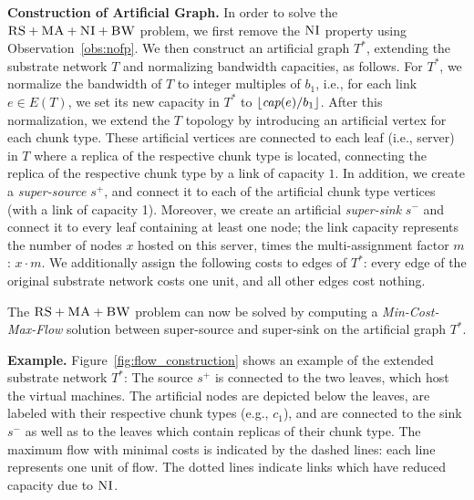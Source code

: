 \documentclass[9pt]{sigcomm-alternate}
\newcommand{\maciek}[1]{\textcolor{brown}{maciek: #1}}
\newcommand{\MaFactor}{m}
\newcommand{\Source}{\ensuremath{s^{+}}}
\newcommand{\Sink}{\ensuremath{s^{-}}}
\newcommand{\achunk}{\ensuremath{c}}
\newcommand{\capacity}{\emph{cap}}
\newcommand{\CC}{\textsc{NI}}
\newcommand{\FP}{\textsc{FP}}
\newcommand{\RS}{\textsc{RS}}
\newcommand{\BW}{\textsc{BW}}
\newcommand{\MA}{\textsc{MA}}
\newcommand{\Tree}{\ensuremath{T}}
\newcommand{\CostTrans}{\ensuremath{b_1}}
\newcommand{\CostCom}{\ensuremath{b_2}}
\begin{document}


\textbf{Construction of Artificial Graph.}
In order to solve the $\RS+\MA+\CC+\BW$ problem,
we first remove the $\CC$ property using Observation~\ref{obs:nofp}. 
We then construct
an artificial graph $\Tree^*$, extending the substrate network $\Tree$ and
normalizing bandwidth capacities, as follows. For $\Tree^*$,
we normalize the bandwidth of $\Tree$ to integer multiples of $\CostTrans$,
i.e., for each link $e\in E(\Tree)$, we set its new
capacity in $\Tree^*$ to $\lfloor\capacity(e)/\CostTrans\rfloor$.
After this normalization, we extend the $\Tree$ topology by
introducing an artificial vertex for each chunk type. These artificial
vertices are connected to each leaf (i.e., server) in $\Tree$ where a replica
 of the respective chunk type is located,
connecting the replica of the respective chunk type by a link of capacity $1$. In
addition, we create a
\emph{super-source} $\Source$, and connect it to each of the artificial chunk
type vertices (with a link of capacity 1). Moreover, we create an artificial \emph{super-sink} $\Sink$ and
connect it to every leaf containing at least one node; the link capacity represents
the number of nodes $x$ hosted on this server, times the multi-assignment factor
$\MaFactor$:
$x \cdot \MaFactor$.
We additionally assign the following costs to edges of $\Tree^*$:
every edge of the original substrate network costs one unit, and all other edges
cost nothing.

The $\RS+\MA+\BW$ problem can now be solved by computing
a \emph{Min-Cost-Max-Flow} solution between super-source and super-sink on the artificial graph $\Tree^*$.

\textbf{Example.} Figure~\ref{fig:flow_construction} shows an example of the extended substrate
network $\Tree^*$: The source $\Source$ is connected to the two leaves, which host the
virtual machines. The artificial nodes are depicted below the leaves, are labeled with
their respective chunk types (e.g., $\achunk_1$), and are connected to the sink
$\Sink$ as well as to the leaves which contain replicas of their chunk type.
The
maximum flow with minimal costs is indicated by the dashed lines: each line
represents one unit of flow. The dotted lines indicate links which have reduced
capacity due to $\CC$.
\end{document}
